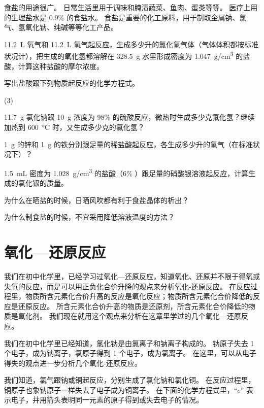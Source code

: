 食盐的用途很广。
日常生活里用于调味和腌渍蔬菜、鱼肉、蛋类等等。
医疗上用的生理盐水是 0.9\% 的食盐水。
食盐是重要的化工原料，用于制取金属钠、氯气、氢氧化钠、纯碱等等化工产品。

\begin{Practice}[习题]
  \begin{question}
    \item \qty{11.2}{L} 氧气和 \qty{11.2}{L} 氢气起反应，生成多少升的氯化氢气体（气体体积都按标准状况计），把生成的氧化氢都溶解在 \qty{328.5}{g} 水里形成密度为 \qty{1.047}{g/cm^3} 的盐酸，计算这种盐酸的摩尔浓度。
    \item 写出盐酸跟下列物质起反应的化学方程式。
    \begin{tasks}(3)
      \task {}
      \task {}
      \task {}
      \task {}
      \task {}
    \end{tasks} 
    \item \qty{11.7}{g} 氯化钠跟 \qty{10}{g} 浓度为 98\% 的硫酸反应，微热时生成多少克氟化氢？继续加热到 \qty{600}{\celsius} 时，又生成多少克的氯化氢？
    \item \qty{1}{g} 的锌和 \qty{1}{g} 的铁分别跟足量的稀盐酸起反应，各生成多少升的氢气（在标准状况下）？
    \item \qty{1.5}{mL} 密度为 \qty{1.028}{g/cm^3} 的盐酸（6\% ）跟足量的硝酸银溶液起反应，计算生成的氯化银的质量。
    \item 为什么在晒盐的时候，日晒风吹都有利于食盐晶体的析出？
    \item 为什么制食盐的时候，不宜采用降低溶液温度的方法？
  \end{question}
\end{Practice}

\section{氧化—还原反应}
我们在初中化学里，已经学习过氧化—还原反应，知道氧化、还原并不限于得氧或失氧的反应，而是可以用正负化合价升降的观点来分析氧化-还原反应。
在反应过程里，物质所含元素化合价升高的反应是氧化反应；物质所含元素化合价降低的反应是还原反应。
所含元素化合价升高的物质是还原剂，所含元素化合价降低的物质是氧化剂。
我们现在就用这个观点来分析在这章里学过的几个氧化—还原反应。

我们在初中化学里已经知道，氯化钠是由氯离子和钠离子构成的。
钠原子失去 1 个电子，成为钠离子，氯原子得到 1 个电子，成为氯离子。
在这里，可以从电子得失的观点进一步分析几个氧化-还原反应。


我们知道，氯气跟钠或铜起反应，分别生成了氯化钠和氯化铜。
在反应过程里，铜原子也象钠原子一样失去了电子成为铜离子。
在下面的化学方程式里，“$e$” 表示电子，并用箭头表明同一元素的原子得到或失去电子的情况。


